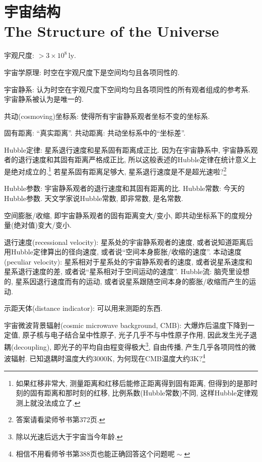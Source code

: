 \chapter{宇宙结构\\The Structure of the Universe}

宇观尺度: $>3\times10^{8}\,\text{ly}$.

宇宙学原理: 时空在宇观尺度下是空间均匀且各项同性的.

宇宙静系: 认为时空在宇观尺度下空间均匀且各项同性的所有观者组成的参考系. 宇宙静系被认为是唯一的.

共动(cosmoving)坐标系: 使得所有宇宙静系观者坐标不变的坐标系.

固有距离: ``真实距离''. 共动距离: 共动坐标系中的``坐标差''.

Hubble定律: 星系退行速度和星系固有距离成正比. 因为在宇宙静系中, 宇宙静系观者的退行速度和其固有距离严格成正比, 所以这般表述的Hubble定律在统计意义上是绝对成立的.\footnote{如果红移非常大, 测量距离和红移后能修正距离得到固有距离, 但得到的是那时刻的固有距离和那时刻的红移, 比例系数(Hubble常数)不同, 这样Hubble定律观测上就没法成立了.} 若星系固有距离足够大, 星系退行速度是不是超光速啦?\footnote{答案请看梁师爷书第372页.}

Hubble参数: 宇宙静系观者的退行速度和其固有距离的比. Hubble常数: 今天的Hubble参数. 天文学家说Hubble常数, 即非常数, 是名常数.

空间膨胀/收缩, 即宇宙静系观者的固有距离变大/变小, 即共动坐标系下的度规分量(绝对值)变大/变小.

退行速度(recessional velocity): 星系处的宇宙静系观者的速度, 或者说知道距离后用Hubble定律算出的径向速度, 或者说``空间本身膨胀/收缩的速度''. 本动速度(peculiar velocity): 星系相对于星系处的宇宙静系观者的速度, 或者说星系速度和星系退行速度的差, 或者说``星系相对于空间运动的速度''. Hubble流: 脑壳里设想的, 星系因退行速度而有的运动, 或者说星系跟随空间本身的膨胀/收缩而产生的运动.

示距天体(distance indicator): 可以用来测距的东西.

宇宙微波背景辐射(cosmic microwave background, CMB): 大爆炸后温度下降到一定值, 原子核与电子结合呈中性原子, 光子几乎不与中性原子作用, 因此发生光子退耦(decoupling), 即光子的平均自由程变得极大\footnote{除以光速后远大于宇宙当今年龄.}, 自由传播, 产生几乎各项同性的微波辐射. 已知退耦时温度大约$3000\text{K}$, 为何现在CMB温度大约$3\text{K}$?\footnote{相信不用看师爷书第388页也能正确回答这个问题呢$\!\sim$}
